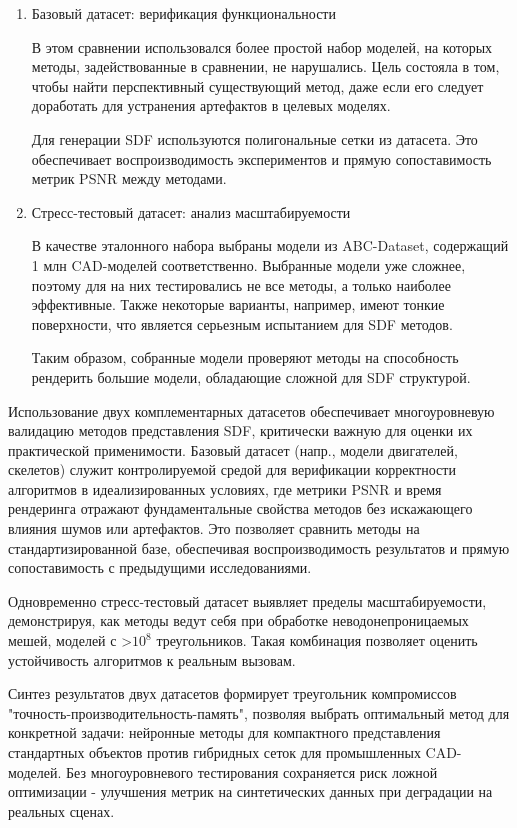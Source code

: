 \documentclass[a4paper,hidelinks,12pt]{article}
\begin{document}
\begin{enumerate}
	\item Базовый датасет: верификация функциональности
	\par
	В этом сравнении использовался более простой набор моделей, на которых методы, задействованные в сравнении, 
	не нарушались. Цель состояла в том, чтобы найти перспективный существующий метод, даже если его следует доработать для 
	устранения артефактов в целевых моделях.

	Для генерации SDF используются полигональные сетки из датасета. Это обеспечивает воспроизводимость экспериментов и 
	прямую сопоставимость метрик PSNR между методами.

	\item Стресс-тестовый датасет: анализ масштабируемости
	\par
	В качестве эталонного набора выбраны модели из ABC-Dataset, содержащий 1 млн CAD-моделей соответственно. Выбранные модели уже сложнее, поэтому 
	для на них тестировались не все методы, а только наиболее эффективные. Также некоторые варианты, например, имеют тонкие поверхности, что является серьезным 
	испытанием для SDF методов. 

	Таким образом, собранные модели проверяют методы на способность рендерить большие модели, обладающие сложной для SDF структурой.

\end{enumerate}

Использование двух комплементарных датасетов обеспечивает многоуровневую валидацию методов представления SDF, критически важную 
для оценки их практической применимости. Базовый датасет (напр., модели двигателей, скелетов) служит контролируемой средой 
для верификации корректности алгоритмов в идеализированных условиях, где метрики PSNR и время рендеринга отражают фундаментальные 
свойства методов без искажающего влияния шумов или артефактов. Это позволяет сравнить методы на стандартизированной базе, 
обеспечивая воспроизводимость результатов и прямую сопоставимость с предыдущими исследованиями.

Одновременно стресс-тестовый датасет выявляет пределы масштабируемости, демонстрируя, как методы ведут себя при обработке 
неводонепроницаемых мешей, моделей с >$10^8$ треугольников. Такая комбинация позволяет оценить устойчивость алгоритмов к реальным вызовам.

Синтез результатов двух датасетов формирует треугольник компромиссов "точность-производительность-память", 
позволяя выбрать оптимальный метод для конкретной задачи: нейронные методы для компактного представления стандартных 
объектов против гибридных сеток для промышленных CAD-моделей. Без многоуровневого тестирования сохраняется риск 
ложной оптимизации - улучшения метрик на синтетических данных при деградации на реальных сценах.
\end{document}
